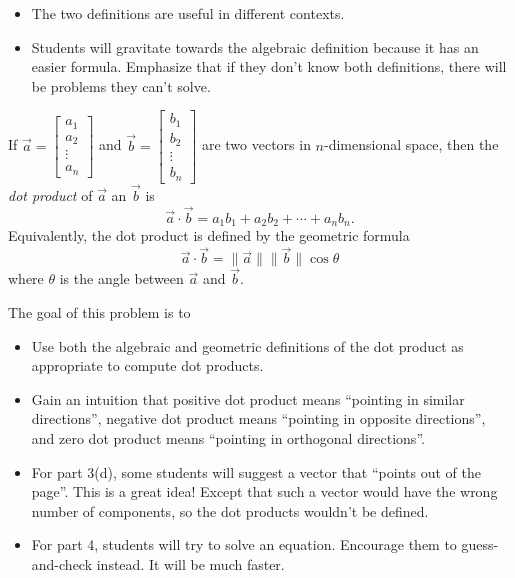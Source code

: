 \documentclass{problemset}
\newcommand{\matc}[1]{\begin{bmatrix}#1\end{bmatrix}}
\begin{document}
	\begin{annotation}
		\begin{notes}
			\begin{itemize}
				\item The two definitions are useful in different contexts.
				\item Students will gravitate towards the algebraic definition because
					it has an easier formula. Emphasize that if they don't know
					both definitions, there will be problems they can't solve.
			\end{itemize}
		\end{notes}
	\end{annotation}
	\begin{definition}
		If $\vec a=\matc{a_1\\a_2\\ \vdots\\a_n}$ and
		$\vec b=\matc{b_1\\b_2\\ \vdots\\b_n}$ are two vectors in $n$-dimensional
		space, then the \emph{dot product} of $\vec a$ an $\vec b$ is
		\[
			\vec a\cdot\vec b = a_1b_1+a_2b_2+\cdots+a_nb_n.
		\]
		Equivalently, the dot product is defined by the geometric formula
		\[
			\vec a\cdot \vec b = \|\vec a\|\|\vec b\|\cos \theta
		\]
		where $\theta$ is the angle between $\vec a$ and $\vec b$.
	\end{definition}

	\question
	\begin{annotation}
		\begin{goals}
			\Goal{Practicing dot products.}

			The goal of this problem is to
			\begin{itemize}
				\item Use both the algebraic and geometric definitions of the dot product
					as appropriate to compute dot products.
				\item Gain an intuition that positive dot product
					means ``pointing in similar directions'', negative dot product
					means ``pointing in opposite directions'', and zero dot product
					means ``pointing in orthogonal directions''.
			\end{itemize}
		\end{goals}

		\begin{notes}
			\begin{itemize}
				\item For part 3(d), some students will suggest a vector
					that ``points out of the page''. This is a great idea!
					Except that such a vector would have the wrong number of components,
					so the dot products wouldn't be defined.
				\item For part 4, students will try to solve an equation. Encourage them
					to guess-and-check instead. It will be much faster.
			\end{itemize}
		\end{notes}
	\end{annotation}
\end{document}
